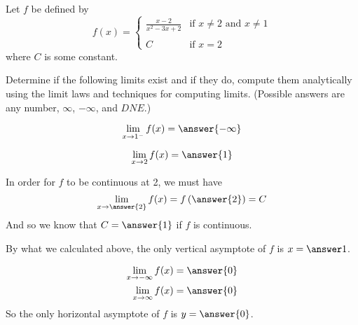 \documentclass{ximera}
\author{Nela Lakos \and Kyle Parsons}
\begin{document}
\begin{exercise}

Let $f$ be defined by
\[
f(x) = 
\begin{cases} 
\frac{x-2}{x^2-3x+2} & \text{if } x\neq 2 \text{ and } x\neq 1 \\ \\
C & \text{if } x=2
   \end{cases}
\]
where $C$ is some constant.

Determine if the following limits exist and if they do, compute them analytically using the limit laws and techniques for computing limits.  (Possible answers are any number, $\infty$, $-\infty$, and $DNE$.)

\begin{exercise}
\[
\lim_{x\to1^-}f(x) = \answer{-\infty}
\]
\begin{exercise}
\[
\lim_{x\to2}f(x) = \answer{1}
\]
\end{exercise}
\end{exercise}

\begin{exercise}
In order for $f$ to be continuous at 2, we must have
\[
\lim_{x\to\answer{2}}f(x) = f\left(\answer{2}\right) = C
\]
And so we know that $C=\answer{1}$ if $f$ is continuous.
\end{exercise}

\begin{exercise}
By what we calculated above, the only vertical asymptote of $f$ is $x=\answer1$.
\end{exercise}

\begin{exercise}
\begin{align*}
\lim_{x\to-\infty}f(x) &= \answer{0}\\
\lim_{x\to\infty}f(x) &= \answer{0}
\end{align*}
So the only horizontal asymptote of $f$ is $y=\answer{0}$.
\end{exercise}

\end{exercise}
\end{document}
